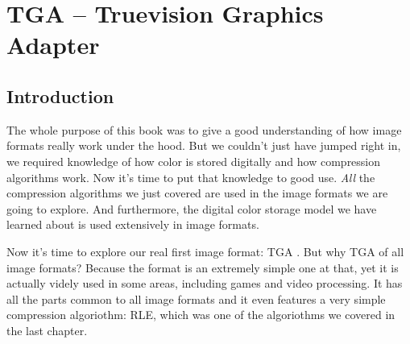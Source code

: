 \begin{comment}
  
\end{comment}

\chapter{TGA -- Truevision Graphics Adapter}
\label{cha:tga}

\begin{refsection}

  \section{Introduction}
  \label{sec:tga-introduction}

  \cite{91:_truev_tga_file_format_specif}

  The whole purpose of this book was to give a good understanding of
  how image formats really work under the hood. But we couldn't just
  have jumped right in, we required knowledge of how color is stored
  digitally and how compression algorithms work. Now it's time to put
  that knowledge to good use. \textit{All} the compression algorithms
  we just covered are used in the image formats we are going to
  explore. And furthermore, the digital color storage model we have
  learned about is used extensively in image formats.

  Now it's time to explore our real first image format: TGA
  . But why TGA of all image formats? Because the format is
  an extremely simple one at that, yet it is actually videly used in
  some areas, including games and video processing. It has all the
  parts common to all image formats and it even features a very simple
  compression algoriothm: RLE, which was one of the algoriothms we
  covered in the last chapter.

  \printbibliography[heading=subbibliography]

\end{refsection}
